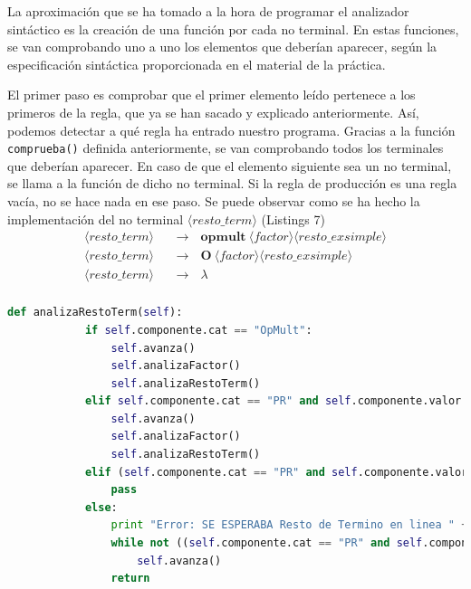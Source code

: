 \documentclass[11pt]{article}
\newcommand{\nt}[1]{\langle#1\rangle}
\newcommand{\regla}[2]{\nt{#1} \ \ \ &\rightarrow \ \ \ #2 \\}
\begin{document}
La aproximación que se ha tomado a la hora de programar el analizador sintáctico es la creación de una función por cada no terminal. En estas funciones, se van comprobando uno a uno los elementos que deberían aparecer, según la especificación sintáctica proporcionada en el material de la práctica. 

El primer paso es comprobar que el primer elemento leído pertenece a los primeros de la regla, que ya se han sacado y explicado anteriormente. Así, podemos detectar a qué regla ha entrado nuestro programa. Gracias a la función \lstinline[language=Python]{comprueba()} definida anteriormente, se van comprobando todos los terminales que deberían aparecer. En caso de que el elemento siguiente sea un no terminal, se llama a la función de dicho no terminal. Si la regla de producción es una regla vacía, no se hace nada en ese paso. Se puede observar como se ha hecho la implementación del no terminal $\nt{resto\_term}$ (Listings 7)
\begin{align*}
	\regla{resto\_term}{\textbf{opmult} \ \nt{factor} \nt{resto\_exsimple}}
	\regla{resto\_term}{\textbf{O} \ \nt{factor} \nt{resto\_exsimple}}
	\regla{resto\_term}{\lambda}
\end{align*}

\begin{minipage}{\linewidth}
	\begin{lstlisting}[language=Python, caption=analizaRestoTerm()]
		def analizaRestoTerm(self):
			if self.componente.cat == "OpMult":
				self.avanza()
				self.analizaFactor()
				self.analizaRestoTerm()
			elif self.componente.cat == "PR" and self.componente.valor == "Y":
				self.avanza()
				self.analizaFactor()
				self.analizaRestoTerm()
			elif (self.componente.cat == "PR" and self.componente.valor in ["ENTONCES", "HACER", "SINO", "O"]) or self.componente.cat == "ParentCi" or self.componente.cat == "CorCi" or self.componente.cat == "OpRel" or self.componente.cat == "PtoComa" or self.componente.cat == "OpAdd":
				pass
			else: 
				print "Error: SE ESPERABA Resto de Termino en linea " + str(self.lexico.nlinea)
				while not ((self.componente.cat == "PR" and self.componente.valor in ["O", "ENTONCES", "HACER", "SINO"]) or self.componente.cat == "OpRel" or self.componente.cat == "OpAdd" or self.componente.cat == "CorCi" or self.componente.cat == "ParentCi" or self.componente.cat == "PtoComa"):
					self.avanza()
				return
	\end{lstlisting}
\end{minipage}
\end{document}
